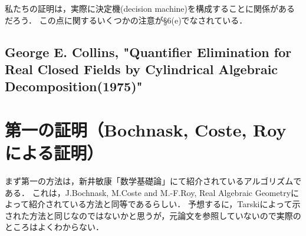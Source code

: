 \documentclass[uplatex, dvipdfmx]{jsarticle}
\theoremstyle{definition}
\begin{document}
私たちの証明は，実際に決定機(decision machine)を構成することに関係があるだろう．
この点に関するいくつかの注意が\S 6(e)でなされている．

\subsection{George E. Collins, "Quantifier Elimination for Real Closed Fields by Cylindrical Algebraic Decomposition(1975)"}

\section{第一の証明（Bochnask, Coste, Royによる証明）}
まず第一の方法は，新井敏康「数学基礎論」にて紹介されているアルゴリズムである．
これは，J.Bochnask, M.Coste and M.-F.Roy, Real Algebraic Geometryによって紹介されている方法と同等であるらしい．
予想するに，Tarskiによって示された方法と同じなのではないかと思うが，元論文を参照していないので実際のところはよくわからない．
\end{document}
